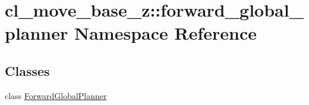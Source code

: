 \hypertarget{namespacecl__move__base__z_1_1forward__global__planner}{}\section{cl\+\_\+move\+\_\+base\+\_\+z\+:\+:forward\+\_\+global\+\_\+planner Namespace Reference}
\label{namespacecl__move__base__z_1_1forward__global__planner}
\subsection*{Classes}
\begin{DoxyCompactItemize}
\item 
class \hyperlink{classcl__move__base__z_1_1forward__global__planner_1_1ForwardGlobalPlanner}{Forward\+Global\+Planner}
\end{DoxyCompactItemize}
